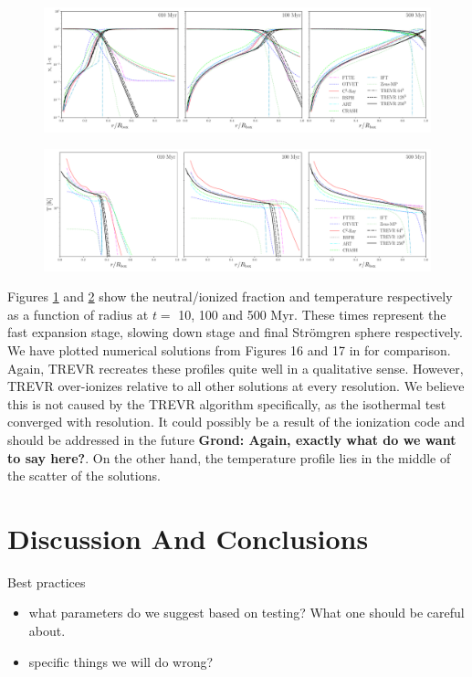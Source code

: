 \documentclass[fleq,usenatbib]{mnras}
\newcommand{\acro}{TREVR}
\newcommand{\comment}[1]{\textbf{\color{red}#1}}
\newcommand{\strom}{Str\"omgren}
\begin{document}
\begin{figure}
\includegraphics[width=0.95\linewidth]{Figures/strom_fraction.pdf}
\caption{}
\label{fig:stromtherm}
\end{figure}
\begin{figure}
\includegraphics[width=0.95\linewidth]{Figures/strom_temp.pdf}
\caption{}
\label{fig:stromtemp}
\end{figure}
Figures \ref{fig:stromtherm} and \ref{fig:stromtemp} show the neutral/ionized 
fraction and temperature respectively as a function of radius at $t=$ 10, 100
and 500 Myr. These times represent the fast expansion stage, slowing down 
stage and final \strom{} sphere respectively. We have plotted numerical 
solutions from Figures 16 and 17 in \cite{ilievEt06} for comparison. Again, 
\acro{} recreates these profiles quite well in a qualitative sense. However, 
\acro{} over-ionizes relative to all other solutions at every resolution. We 
believe this is not caused by the \acro{} algorithm specifically, as the 
isothermal test converged with resolution. It could possibly be a result of 
the ionization code and should be addressed in the future \comment{Grond:
Again, exactly what do we want to say here?}. On the other hand, the 
temperature profile lies in the middle of the scatter of the \cite{ilievEt06} 
solutions.


\section{Discussion And Conclusions}\label{sec:disc}
\noindent Best practices
\begin{itemize}
\item what parameters do we suggest based on testing? What one should be 
careful about.
\item specific things we will do wrong?
\end{itemize}
\end{document}
